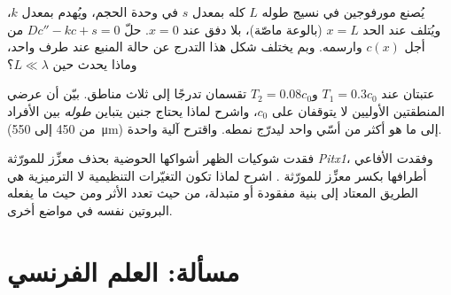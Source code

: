 \begin{exercise}[$\star\star\star$]\label{exo:b3:developmental-genetics:10}
يُصنع مورفوجين في نسيج طوله $L$ كله بمعدل $s$ في وحدة الحجم،
ويُهدم بمعدل $k$، ويُتلف عند الحد $x =
L$ (بالوعة ماصّة)، بلا دفق عند $x = 0$. حلّ $Dc'' - kc + s =
0$ من أجل $c(x)$ وارسمه. وبم يختلف شكل هذا التدرج عن حالة
المنبع عند طرف واحد، وماذا يحدث حين $L \ll \lambda$؟
\end{exercise}

\begin{exercise}[$\star\star\star$]\label{exo:b3:developmental-genetics:11}
عتبتان عند $T_{1} = 0.3c_{0}$ و$T_{2} = 0.08c_{0}$ تقسمان
تدرجًا إلى ثلاث مناطق. بيّن أن عرضي المنطقتين الأوليين لا
يتوقفان على $c_{0}$، واشرح لماذا يحتاج جنين يتباين \emph{طوله}
بين الأفراد (من \qty{450}{} إلى \qty{550}{\micro m}) إلى ما هو
أكثر من أسّي واحد ليدرّج نمطه. واقترح آلية واحدة.
\end{exercise}

\begin{exercise}[$\star\star\star$]\label{exo:b3:developmental-genetics:12}
فقدت شوكيات الظهر أشواكها الحوضية بحذف معزِّز للمورّثة \emph{Pitx1}،
وفقدت الأفاعي أطرافها بكسر معزِّز للمورّثة \emph{}.
اشرح لماذا تكون التغيّرات التنظيمية لا الترميزية هي الطريق
المعتاد إلى بنية مفقودة أو متبدلة، من حيث تعدد الأثر ومن حيث
ما يفعله البروتين نفسه في مواضع أخرى.
\end{exercise}

\section{مسألة: العلم الفرنسي}

